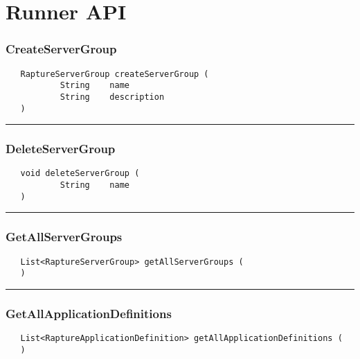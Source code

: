 \chapter{Runner API}

\subsection{CreateServerGroup}
\label{Api:CreateServerGroup}
\begin{verbatim}
   RaptureServerGroup createServerGroup (
           String    name
           String    description
   )
\end{verbatim}



\rule{15cm}{2pt}
\subsection{DeleteServerGroup}
\label{Api:DeleteServerGroup}
\begin{verbatim}
   void deleteServerGroup (
           String    name
   )
\end{verbatim}



\rule{15cm}{2pt}
\subsection{GetAllServerGroups}
\label{Api:GetAllServerGroups}
\begin{verbatim}
   List<RaptureServerGroup> getAllServerGroups (
   )
\end{verbatim}



\rule{15cm}{2pt}
\subsection{GetAllApplicationDefinitions}
\label{Api:GetAllApplicationDefinitions}
\begin{verbatim}
   List<RaptureApplicationDefinition> getAllApplicationDefinitions (
   )
\end{verbatim}



